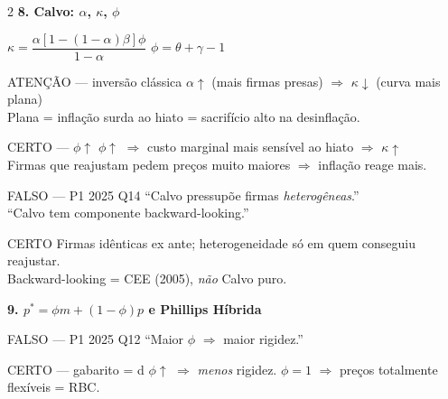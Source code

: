 \documentclass[10pt, a4paper]{article}
\begin{document}
\begin{multicols}{2}
\vspace{0.5em}
\textbf{\color{azul}\large 8. Calvo: $\alpha$, $\kappa$, $\phi$}

\begin{formulabox}
$\kappa = \dfrac{\alpha[1-(1-\alpha)\beta]\phi}{1-\alpha}$ \qquad $\phi = \theta+\gamma-1$
\end{formulabox}

\begin{errobox}{ATENÇÃO — inversão clássica}
$\alpha\uparrow$ (mais firmas presas) $\Rightarrow$ $\kappa\downarrow$ (curva mais plana)\\
Plana = inflação surda ao hiato = sacrifício alto na desinflação.
\end{errobox}
\vspace{0.3em}
\begin{certobox}{CERTO — $\phi\uparrow$}
$\phi\uparrow$ $\Rightarrow$ custo marginal mais sensível ao hiato $\Rightarrow$ $\kappa\uparrow$\\
Firmas que reajustam pedem preços muito maiores $\Rightarrow$ inflação reage mais.
\end{certobox}

\begin{errobox}{FALSO — P1 2025 Q14}
``Calvo pressupõe firmas \emph{heterogêneas}.''\\
``Calvo tem componente backward-looking.''
\end{errobox}
\vspace{0.3em}
\begin{certobox}{CERTO}
Firmas idênticas ex ante; heterogeneidade só em quem conseguiu reajustar.\\
Backward-looking = CEE (2005), \emph{não} Calvo puro.
\end{certobox}

\vspace{0.5em}
\textbf{\color{azul}\large 9. $p^* = \phi m + (1-\phi)p$ e Phillips Híbrida}

\begin{errobox}{FALSO — P1 2025 Q12}
``Maior $\phi$ $\Rightarrow$ maior rigidez.''
\end{errobox}
\vspace{0.3em}
\begin{certobox}{CERTO — gabarito = d}
$\phi\uparrow$ $\Rightarrow$ \emph{menos} rigidez. $\phi=1$ $\Rightarrow$ preços totalmente flexíveis = RBC.
\end{certobox}


\end{multicols}
\end{document}
